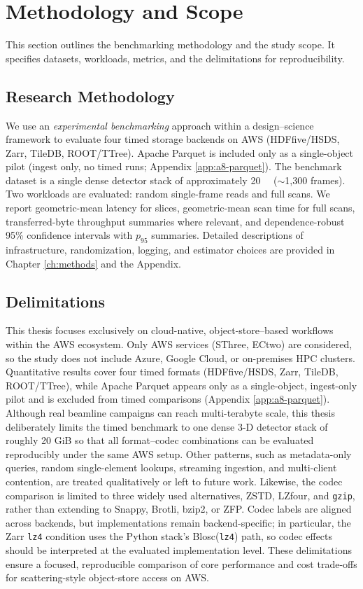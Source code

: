 \documentclass[nomenclature, english, bibtex]{kththesis}
\numberwithin{listing}{chapter}
\begin{document}
\section{Methodology and Scope}
This section outlines the benchmarking methodology and the study scope. It specifies datasets, workloads, metrics, and the delimitations for reproducibility.

\subsection{Research Methodology}
We use an \emph{experimental benchmarking} approach within a design–science framework to evaluate four timed storage backends on \gls{AWS} (\gls{HDFfive}/\gls{HSDS}, Zarr, TileDB, \gls{ROOT}/\gls{TTree}). Apache Parquet is included only as a single-object pilot (ingest only, no timed runs; Appendix \ref{app:a8-parquet}). The benchmark dataset is a single dense detector stack of approximately \SI{20}{\gibi\byte} (\(\sim\)1{,}300 frames). Two workloads are evaluated: random single-frame reads and full scans. We report geometric-mean latency for slices, geometric-mean scan time for full scans, transferred-byte throughput summaries where relevant, and dependence-robust 95\% confidence intervals with $p_{95}$ summaries. Detailed descriptions of infrastructure, randomization, logging, and estimator choices are provided in Chapter \ref{ch:methods} and the Appendix.

\subsection{Delimitations}
This thesis focuses exclusively on cloud-native, object-store–based workflows within the \gls{AWS} ecosystem. Only \gls{AWS} services (\gls{SThree}, \gls{ECtwo}) are considered, so the study does not include Azure, Google Cloud, or on-premises \gls{HPC} clusters. Quantitative results cover four timed formats (\gls{HDFfive}/\gls{HSDS}, Zarr, TileDB, \gls{ROOT}/\gls{TTree}), while Apache Parquet appears only as a single-object, ingest-only pilot and is excluded from timed comparisons (Appendix \ref{app:a8-parquet}). Although real beamline campaigns can reach multi-terabyte scale, this thesis deliberately limits the timed benchmark to one dense 3-D detector stack of roughly 20 GiB so that all format–codec combinations can be evaluated reproducibly under the same \gls{AWS} setup. Other patterns, such as metadata-only queries, random single-element lookups, streaming ingestion, and multi-client contention, are treated qualitatively or left to future work. Likewise, the codec comparison is limited to three widely used alternatives, \gls{ZSTD}, \gls{LZfour}, and \texttt{gzip}, rather than extending to Snappy, Brotli, bzip2, or ZFP. Codec labels are aligned across backends, but implementations remain backend-specific; in particular, the Zarr \texttt{lz4} condition uses the Python stack's Blosc(\texttt{lz4}) path, so codec effects should be interpreted at the evaluated implementation level. These delimitations ensure a focused, reproducible comparison of core performance and cost trade-offs for scattering-style object-store access on \gls{AWS}.
\end{document}
